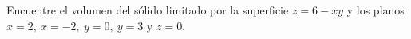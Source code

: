 \item Encuentre el volumen del sólido limitado por la superficie $z = 6 - xy$ y los planos $x = 2, \ x = -2, \ y = 0, \ y = 3$ y $z = 0$.
